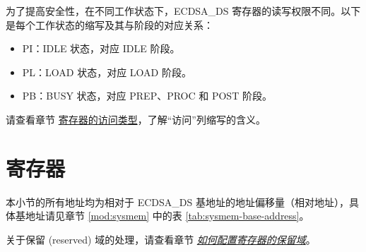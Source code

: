 \documentclass[main\_\_CN.tex]{subfiles}
\begin{document}
为了提高安全性，在不同工作状态下，ECDSA\_DS 寄存器的读写权限不同。以下是每个工作状态的缩写及其与阶段的对应关系：

\begin{itemize}
    \item PI：IDLE 状态，对应 IDLE 阶段。
    \item PL：LOAD 状态，对应 LOAD 阶段。
    \item PB：BUSY 状态，对应 PREP、PROC 和 POST 阶段。
\end{itemize}

请查看章节 \hyperref[glossary-access-types]{寄存器的访问类型}，了解“访问”列缩写的含义。






\newpage
\section{寄存器}

本小节的所有地址均为相对于 ECDSA\_DS 基地址的地址偏移量（相对地址），具体基地址请见章节 \ref{mod:sysmem} \textit{} 中的表 \ref{tab:sysmem-base-address}。

关于保留 (reserved) 域的处理，请查看章节 \hyperref[programming-reserved-field]{\textit{如何配置寄存器的保留域}}。


\end{document}

